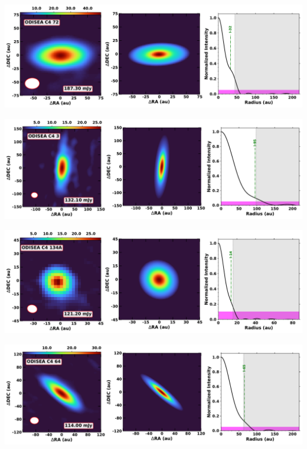 \vspace{0pt}
\begin{minipage}{.49\textwidth}
	 \centering
	 	 \hrulesep
	 	 \includegraphics[width=1\linewidth]{pdf/1+I_F/078_odisea_c4_72_cutout.pdf}
\end{minipage}%
\vrulesep
\begin{minipage}{.49\textwidth}
	 \centering
	 	 \hrulesep
	 	 \includegraphics[width=1\linewidth]{pdf/1+I_F/072_odisea_c4_3_cutout.pdf}
\end{minipage}%
\vspace{0pt}
\begin{minipage}{.49\textwidth}
	 \centering
	 	 \hrulesep
	 	 \includegraphics[width=1\linewidth]{pdf/1+I_F/069_odisea_c4_134a_cutout.pdf}
\end{minipage}%
\vrulesep
\begin{minipage}{.49\textwidth}
	 \centering
	 	 \hrulesep
	 	 \includegraphics[width=1\linewidth]{pdf/1+I_F/068_odisea_c4_64_cutout.pdf}
\end{minipage}%
\vspace{0.8cm}